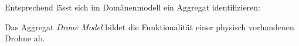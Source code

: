 Entsprechend  lässt sich im Domänenmodell ein Aggregat identifizieren:

Das Aggregat \textit{Drone Model} bildet die Funktionalität einer physisch vorhandenen Drohne ab.







